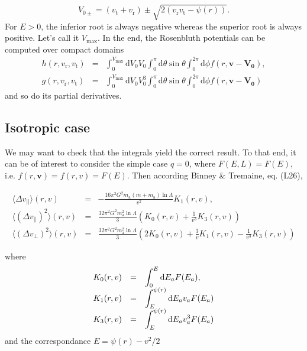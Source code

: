 \documentclass[11pt]{article}
\newcommand{\rt}{\mathrm{t}}
\newcommand{\rr}{\mathrm{r}}
\newcommand{\vr}{v_{\rr}}
\newcommand{\vt}{v_{\rt}}
\newcommand{\bv}{\boldsymbol{v}}
\newcommand{\ra}{\mathrm{a}}
\newcommand{\dvPar}{\Delta v_{||}}
\newcommand{\dvPerp}{\Delta v_{\perp}}
\newcommand{\dvParAvrLoc}{\langle \dvPar \rangle}
\newcommand{\dvParSqAvrLoc}{\langle(\dvPar)^{2}\rangle}
\newcommand{\dvPerpSqAvrLoc}{\langle(\dvPerp)^{2}\rangle}
\newcommand{\ma}{m_{\ra}}
\newcommand{\bV}[1]{\boldsymbol{V_{#1}}}
\newcommand{\rd}{{\mathrm{d}}}
\newcommand{\Vmax}{V_{\max}}
\begin{document}
\begin{equation}
  V_{0 \pm} = (\vt+\vr)\pm\sqrt{2(\vr\vt-\psi(r))}.
  \label{eq:Vmax}
\end{equation}
For $E>0$, the inferior root is always negative whereas the superior root is always positive. Let's call it $\Vmax$. In the end, the Rosenbluth potentials can be computed over compact domains
\begin{equation}
  \boxed{
\begin{array}{ccl}
  h(r,\vr,\vt) &=& \displaystyle{\int_{0}^{\Vmax}{\rd}V_{0} V_{0}\int_{0}^{\pi}{\rd}\theta\sin\theta\int_{0}^{2\pi}{\rd}\phi f(r,\bv-\bV0)} ,\\
  g(r,\vr,\vt) &=& \displaystyle{\int_{0}^{\Vmax}{\rd}V_{0} V_{0}^{3}\int_{0}^{\pi}{\rd}\theta\sin\theta\int_{0}^{2\pi}{\rd}\phi f(r,\bv-\bV0)}
\end{array}
}
\label{eq:Rosenbluth_finite}
\end{equation}
and so do its partial derivatives.

\subsection{Isotropic case}
\label{subsec:Isotropic}

We may want to check that the integrals yield the correct result.
To that end, it can be of interest to consider the simple case $q=0$,
where $F(E,L)=F(E)$, i.e. $f(r,\bv)=f(r,v)=F(E)$.
Then according Binney \& Tremaine, eq. (L26),

\begin{equation}
\begin{array}{ccl}
  \dvParAvrLoc(r,v) & =&\displaystyle{-\frac{16\pi^{2}G^{2}\ma(m+\ma)\ln\Lambda}{v^{2}}K_{1}(r,v)} ,\\
  
  \dvParSqAvrLoc(r,v) & = &\displaystyle{\frac{32\pi^{2}G^{2}\ma^{2}\ln\Lambda}{3}\left(K_{0}(r,v)+\frac{1}{v^{3}}K_{3}(r,v)\right)}\\
  
  \dvPerpSqAvrLoc(r,v) & = &\displaystyle{\frac{32\pi^{2}G^{2}\ma^{2}\ln\Lambda}{3}\left(2K_{0}(r,v)+\frac{3}{v}K_{1}(r,v)-\frac{1}{v^{3}}K_{3}(r,v)\right)}   
\end{array}
\label{eq:IsoLocDiffCoefsdRdT}
\end{equation}

where
\begin{equation}
\begin{array}{ccl}
 K_{0}(r,v) & =&\displaystyle{\int_{0}^{E}{\rm d}E_{a}F(E_{a})} ,\\
  
  K_{1}(r,v) & = &\displaystyle{\int_{E}^{\psi(r)}{\rm d}E_{a}v_{a}F(E_{a})}\\
  
  K_{3}(r,v) & = &\displaystyle{\int_{E}^{\psi(r)}{\rm d}E_{a}v_{a}^{3}F(E_{a})}   
\end{array}
\label{eq:K_Iso}
\end{equation}
and the correspondance $E = \psi(r)-v^{2}/2$
\end{document}

